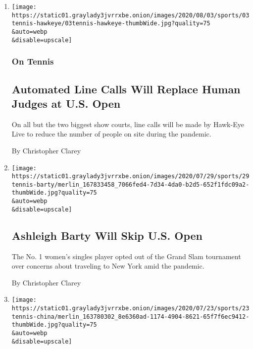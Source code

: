 \begin{enumerate}
\def\labelenumi{\arabic{enumi}.}
\item
  \href{/2020/08/03/sports/tennis/us-open-hawkeye-line-judges.html}{}

  \texttt{[image: https://static01.graylady3jvrrxbe.onion/images/2020/08/03/sports/03tennis-hawkeye/03tennis-hawkeye-thumbWide.jpg?quality=75\\\&auto=webp\\\&disable=upscale]}

  \hypertarget{on-tennis}{%
  \subsubsection{On Tennis}\label{on-tennis}}

  \hypertarget{automated-line-calls-will-replace-human-judges-at-us-open}{%
  \subsection{Automated Line Calls Will Replace Human Judges at U.S.
  Open}\label{automated-line-calls-will-replace-human-judges-at-us-open}}

  On all but the two biggest show courts, line calls will be made by
  Hawk-Eye Live to reduce the number of people on site during the
  pandemic.

  By Christopher Clarey
\item
  \href{/2020/07/29/sports/tennis/ashleigh-barty-us-open.html}{}

  \texttt{[image: https://static01.graylady3jvrrxbe.onion/images/2020/07/29/sports/29tennis-barty/merlin\_167833458\_7066fed4-7d34-4da0-b2d5-652f1fdc09a2-thumbWide.jpg?quality=75\\\&auto=webp\\\&disable=upscale]}

  \hypertarget{ashleigh-barty-will-skip-us-open}{%
  \subsection{Ashleigh Barty Will Skip U.S.
  Open}\label{ashleigh-barty-will-skip-us-open}}

  The No. 1 women's singles player opted out of the Grand Slam
  tournament over concerns about traveling to New York amid the
  pandemic.

  By Christopher Clarey
\item
  \href{/2020/07/23/sports/tennis/wta-tour-china-tournaments-canceled.html}{}

  \texttt{[image: https://static01.graylady3jvrrxbe.onion/images/2020/07/23/sports/23tennis-china/merlin\_163780302\_8e6360ad-1174-4904-8621-65f7f6ec9412-thumbWide.jpg?quality=75\\\&auto=webp\\\&disable=upscale]}


\end{enumerate}
